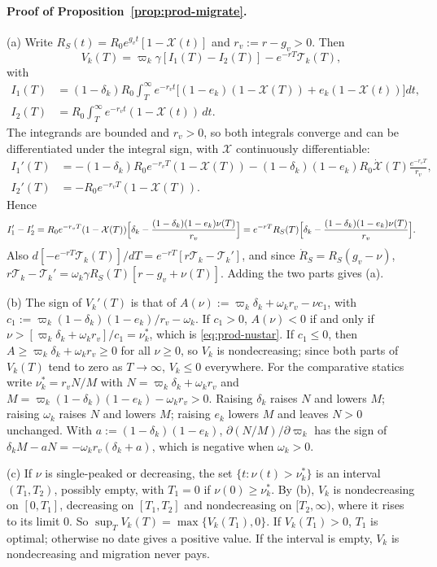 \paragraph{Proof of Proposition~\ref{prop:prod-migrate}.}
(a) Write $R_S(t)=R_0e^{g_vt}[1-\mathcal X(t)]$ and $r_v:=r-g_v>0$. Then
\[
V_k(T)=\varpi_k\gamma[I_1(T)-I_2(T)]-e^{-rT}\mathcal T_k(T),
\]
with
\[
\begin{aligned}
I_1(T)&=(1-\delta_k)R_0\int_T^\infty e^{-r_vt}\bigl[(1-e_k)(1-\mathcal X(T))+e_k(1-\mathcal X(t))\bigr]dt,\\
I_2(T)&=R_0\int_T^\infty e^{-r_vt}(1-\mathcal X(t))\,dt .
\end{aligned}
\]
The integrands are bounded and $r_v>0$, so both integrals converge and can be differentiated under the integral sign, with $\mathcal X$ continuously differentiable:
\[
\begin{aligned}
I_1'(T)&=-(1-\delta_k)R_0e^{-r_vT}(1-\mathcal X(T))-(1-\delta_k)(1-e_k)R_0\dot{\mathcal X}(T)\frac{e^{-r_vT}}{r_v},\\
I_2'(T)&=-R_0e^{-r_vT}(1-\mathcal X(T)).
\end{aligned}
\]
Hence
\[
I_1'-I_2'=R_0e^{-r_vT}(1-\mathcal X(T))\Bigl[\delta_k-\frac{(1-\delta_k)(1-e_k)\nu(T)}{r_v}\Bigr]=e^{-rT}R_S(T)\Bigl[\delta_k-\frac{(1-\delta_k)(1-e_k)\nu(T)}{r_v}\Bigr].
\] Also $d[-e^{-rT}\mathcal T_k(T)]/dT=e^{-rT}[r\mathcal T_k-\mathcal T_k']$, and since $\dot R_S=R_S(g_v-\nu)$, $r\mathcal T_k-\mathcal T_k'=\omega_k\gamma R_S(T)[r-g_v+\nu(T)]$. Adding the two parts gives (a).

(b) The sign of $V_k'(T)$ is that of $A(\nu):=\varpi_k\delta_k+\omega_kr_v-\nu c_1$, with $c_1:=\varpi_k(1-\delta_k)(1-e_k)/r_v-\omega_k$. If $c_1>0$, $A(\nu)<0$ if and only if $\nu>[\varpi_k\delta_k+\omega_kr_v]/c_1=\nu^*_k$, which is \eqref{eq:prod-nustar}. If $c_1\le 0$, then $A\ge\varpi_k\delta_k+\omega_kr_v\ge 0$ for all $\nu\ge 0$, so $V_k$ is nondecreasing; since both parts of $V_k(T)$ tend to zero as $T\to\infty$, $V_k\le 0$ everywhere. For the comparative statics write $\nu^*_k=r_vN/M$ with $N=\varpi_k\delta_k+\omega_kr_v$ and $M=\varpi_k(1-\delta_k)(1-e_k)-\omega_kr_v>0$. Raising $\delta_k$ raises $N$ and lowers $M$; raising $\omega_k$ raises $N$ and lowers $M$; raising $e_k$ lowers $M$ and leaves $N>0$ unchanged. With $a:=(1-\delta_k)(1-e_k)$, $\partial(N/M)/\partial\varpi_k$ has the sign of $\delta_kM-aN=-\omega_kr_v(\delta_k+a)$, which is negative when $\omega_k>0$.

(c) If $\nu$ is single-peaked or decreasing, the set $\{t:\nu(t)>\nu^*_k\}$ is an interval $(T_1,T_2)$, possibly empty, with $T_1=0$ if $\nu(0)\ge\nu^*_k$. By (b), $V_k$ is nondecreasing on $[0,T_1]$, decreasing on $[T_1,T_2]$ and nondecreasing on $[T_2,\infty)$, where it rises to its limit $0$. So $\sup_TV_k(T)=\max\{V_k(T_1),0\}$. If $V_k(T_1)>0$, $T_1$ is optimal; otherwise no date gives a positive value. If the interval is empty, $V_k$ is nondecreasing and migration never pays.


